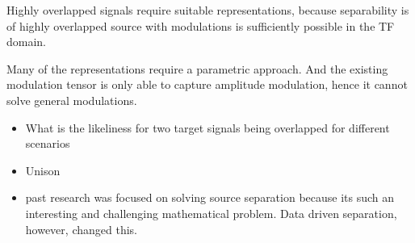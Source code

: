 

Highly overlapped signals require suitable representations, because separability is of highly overlapped source with modulations is sufficiently possible in the TF domain.

Many of the representations require a parametric approach. And the existing modulation tensor is only able to capture amplitude modulation, hence it cannot solve general modulations.

\begin{itemize}
  \item What is the likeliness for two target signals being overlapped for different scenarios
  \item Unison
  \item past research was focused on solving source separation because its such an interesting and challenging mathematical problem. Data driven separation, however, changed this.
\end{itemize}
